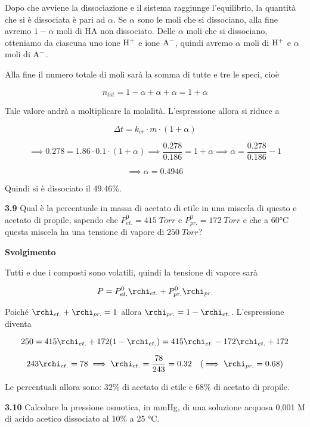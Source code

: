 Dopo che avviene la dissociazione e il sistema raggiunge l'equilibrio, la quantità che si è dissociata è pari ad $\alpha$. Se $\alpha$ sono le moli che si dissociano, alla fine avremo $1-\alpha$ moli di HA non dissociato. Delle $\alpha$ moli che si dissociano, otteniamo da ciascuna uno ione $\rm H^+$ e ione $\rm A^-$, quindi avremo $\alpha$ moli di $\rm H^+$ e $\alpha$ moli di $\rm A^-$.

Alla fine il numero totale di moli sarà la somma di tutte e tre le speci, cioè

$$n_{tot}=1 - \alpha + \alpha + \alpha=1+\alpha$$

Tale valore andrà a moltiplicare la molalità. L'espressione allora si riduce a

$$\Delta t=k_{cr} \cdot m \cdot (1 + \alpha)$$

$$\implies
0.278 = 1.86 \cdot 0.1 \cdot (1+\alpha)
\implies
\frac{0.278}{0.186}= 1 + \alpha
\implies
\alpha=\frac{0.278}{0.186} - 1$$

$$\implies \alpha=0.4946$$

Quindi si è dissociato il 49.46\%.

\vspace{0.2cm}\textbf{3.9} Qual è la percentuale in massa di acetato di etile in una miscela di questo e acetato di propile, sapendo che $P_{et.}^0=415\;Torr$ e $P_{pr.}^0=172\;Torr$ e che a 60°C questa miscela ha una tensione di vapore di $250\;Torr$?

\vspace{0.2cm}\large\textbf{Svolgimento}\normalsize

\vspace{0.2cm}Tutti e due i composti sono volatili, quindi la tensione di vapore sarà

$$P=P_{et.}^0\rchi_{et.} + P_{pr.}^0\rchi_{pr.}$$

Poiché $\rchi_{et.} + \rchi_{pr.}=1$ allora $\rchi_{pr.}=1 - \rchi_{et.}$. L'espressione diventa

$$250=415 \rchi_{et.} + 172(1 - \rchi_{et.})
=415 \rchi_{et.} - 172 \rchi_{et.} + 172$$

$$243\rchi_{et.}=78
\implies
\rchi_{et.}=\frac{78}{243}=0.32\quad(\implies \rchi_{pr.}=0.68)$$

Le percentuali allora sono: 32\% di acetato di etile e 68\% di acetato di propile.

\vspace{0.2cm}\textbf{3.10} Calcolare la pressione osmotica, in mmHg, di una soluzione acquosa 0,001 M di acido acetico dissociato al 10\% a 25 °C.

